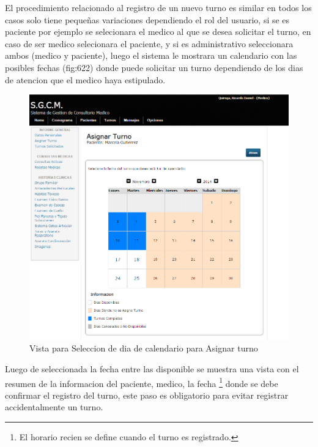 El procedimiento relacionado al registro de un nuevo turno es similar en todos
los casos solo tiene pequeñas variaciones dependiendo el rol del usuario, si se
es paciente por ejemplo se selecionara el medico al que se desea solicitar el
turno, en caso de ser medico selecionara el paciente, y si es administrativo
seleccionara ambos (medico y paciente), luego el sistema le mostrara un calendario
con las posibles fechas (fig:622) donde puede solicitar un turno dependiendo
de los dias de atencion que el medico haya estipulado.

\begin{figure}[H]
    \centering
    \includegraphics[scale=0.5]{resourse/calendario.png}
    \caption{Vista para Seleccion de dia de calendario para Asignar turno}
    \label{fig:622}
\end{figure}

Luego de seleccionada la fecha entre las disponible se muestra una vista con el
resumen de la informacion del paciente, medico, la fecha \footnote{El horario recien
se define cuando el turno es registrado.} donde se debe confirmar el registro del
turno, este paso es obligatorio para evitar registrar accidentalmente un turno.

